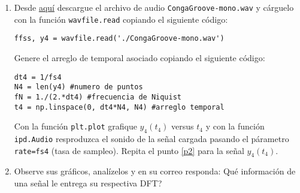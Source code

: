\documentclass[11pt]{exam}
\begin{document}
\begin{enumerate}
\item Desde \href{https://github.com/PythonUdeC/CPC19/blob/master/datas/CongaGroove-mono.wav}{aqu\'i} descargue el archivo de audio \texttt{CongaGroove-mono.wav} y c\'arguelo con la funci\'on \texttt{wavfile.read} copiando el siguiente c\'odigo:
\begin{verbatim}
ffss, y4 = wavfile.read('./CongaGroove-mono.wav')
\end{verbatim}

Genere el arreglo de temporal asociado copiando el siguiente c\'odigo:
\begin{verbatim}
dt4 = 1/fs4
N4 = len(y4) #numero de puntos
fN = 1./(2.*dt4) #frecuencia de Niquist
t4 = np.linspace(0, dt4*N4, N4) #arreglo temporal
\end{verbatim}

Con la funci\'on \texttt{plt.plot} grafique $y_{4}(t_{4})$ versus $t_{4}$ y con la funci\'on \texttt{ipd.Audio} resproduzca el sonido de la se\~nal cargada pasando el p\'arametro \texttt{rate=fs4} (tasa de sampleo). Repita el punto \ref{p2} para la se\~nal $y_{4}(t_{4})$.
 
\item Observe sus gr\'aficos, analízelos y en su correo responda: \textquestiondown Qu\'e informaci\'on de una se\~nal le entrega su respectiva DFT?
\end{enumerate}
\end{document}
